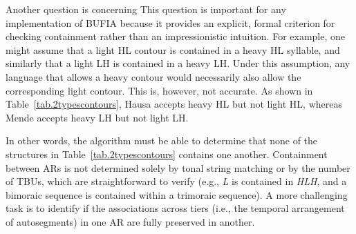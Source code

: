 


Another question is concerning This question is important for any implementation of BUFIA because it
provides an explicit, formal criterion for checking containment rather
than an impressionistic intuition.  For example, one might assume that
a light HL contour is contained in a heavy HL syllable, and similarly
that a light LH is contained in a heavy LH. Under this assumption, any
language that allows a heavy contour would necessarily also allow the
corresponding light contour. This is, however, not accurate. As shown
in Table~\ref{tab.2typescontours}, Hausa accepts heavy HL but not
light HL, whereas Mende accepts heavy LH but not light LH.

In other words, the algorithm must be able to determine that none 
of the structures in Table~\ref{tab.2typescontours} contains 
one another. Containment between ARs is not determined solely 
by tonal string matching or by the number of TBUs, which are 
straightforward to verify (e.g., \textit{L} is contained in \textit{HLH}, 
and a bimoraic sequence is contained within a trimoraic sequence). A more  
challenging task is to identify if the associations across tiers (i.e., the 
temporal arrangement of autosegments) in one AR are fully preserved in another.

